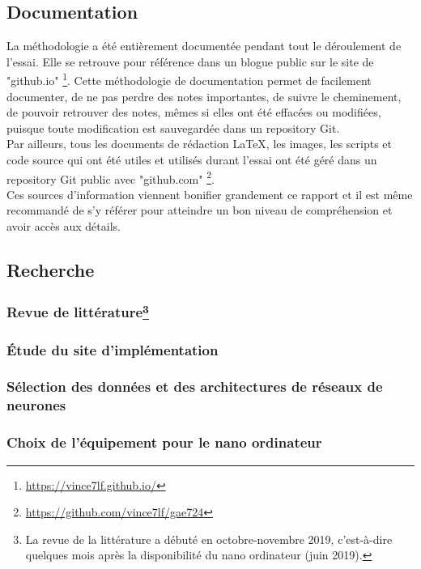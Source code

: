 \subsection{Documentation}
\noindent La méthodologie a été entièrement documentée pendant tout le déroulement de l'essai. Elle se retrouve pour référence dans un blogue public sur le site de "github.io" \footnote{\url{https://vince7lf.github.io/}}. Cette méthodologie de documentation permet de facilement documenter, de ne pas perdre des notes importantes, de suivre le cheminement, de pouvoir retrouver des notes, mêmes si elles ont été effacées ou modifiées, puisque toute modification est sauvegardée dans un repository Git.
\vspace{\baselineskip}
\\
\noindent Par ailleurs, tous les documents de rédaction LaTeX, les images, les scripts et code source qui ont été utiles et utilisés durant l'essai ont été géré dans un repository Git public avec "github.com" \footnote{\url{https://github.com/vince7lf/gae724}}. 
\vspace{\baselineskip}
\\
\noindent Ces sources d'information viennent bonifier grandement ce rapport et il est même recommandé de s'y référer pour atteindre un bon niveau de compréhension et avoir accès aux détails. 
\subsection{Recherche}

\subsubsection[Revue de littérature]{Revue de littérature\footnote{La revue de la littérature a débuté en octobre-novembre 2019, c'est-à-dire quelques mois après la disponibilité du nano ordinateur (juin 2019).}}

\subsubsection{Étude du site d'implémentation}

\subsubsection{Sélection des données et des architectures de réseaux de neurones}

\subsubsection{Choix de l'équipement pour le nano ordinateur}

